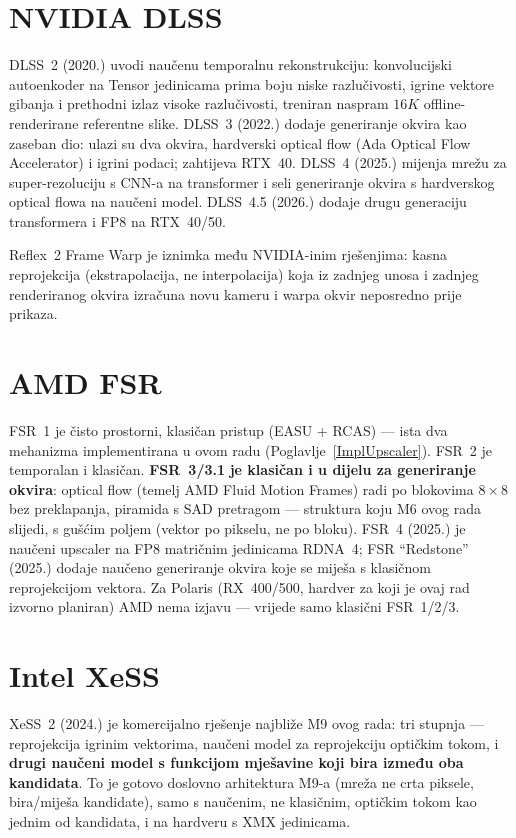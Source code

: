 \documentclass{mathos}
\begin{document}
\section{NVIDIA DLSS}

DLSS~2 (2020.) \cite{DLSSNvidia} uvodi naučenu temporalnu rekonstrukciju: konvolucijski
autoenkoder na Tensor jedinicama prima boju niske razlučivosti, igrine
vektore gibanja i prethodni izlaz visoke razlučivosti, treniran naspram
$16K$ offline-renderirane referentne slike. DLSS~3 (2022.) dodaje generiranje
okvira kao zaseban dio: ulazi su dva okvira, hardverski optical flow (Ada
Optical Flow Accelerator) i igrini podaci; zahtijeva RTX~40. DLSS~4 (2025.)
mijenja mrežu za super-rezoluciju s CNN-a na transformer i seli generiranje
okvira s hardverskog optical flowa na naučeni model. DLSS~4.5 (2026.) dodaje
drugu generaciju transformera i FP8 na RTX~40/50.

Reflex~2 Frame Warp \cite{ReflexNvidia} je iznimka među NVIDIA-inim rješenjima: kasna
reprojekcija (ekstrapolacija, ne interpolacija) koja iz zadnjeg unosa i
zadnjeg renderiranog okvira izračuna novu kameru i warpa okvir neposredno
prije prikaza.

\section{AMD FSR}

FSR~1 je čisto prostorni, klasičan pristup (EASU + RCAS) — ista dva
mehanizma implementirana u ovom radu (Poglavlje~\ref{ImplUpscaler}). FSR~2
je temporalan i klasičan. \textbf{FSR~3/3.1} \cite{FSR3GPUOpen} \textbf{je klasičan i u dijelu za
generiranje okvira}: optical flow (temelj AMD Fluid Motion Frames) radi po
blokovima $8\times8$ bez preklapanja, piramida s SAD pretragom — struktura
koju M6 ovog rada slijedi, s gušćim poljem (vektor po pikselu, ne po bloku).
FSR~4 (2025.) je naučeni upscaler na FP8 matričnim jedinicama RDNA~4; FSR
``Redstone'' (2025.) dodaje naučeno generiranje okvira koje se miješa s
klasičnom reprojekcijom vektora. Za Polaris (RX~400/500, hardver za koji je
ovaj rad izvorno planiran) AMD nema izjavu — vrijede samo klasični FSR~1/2/3.

\section{Intel XeSS}

XeSS~2 (2024.) \cite{XeSSIntel} je komercijalno rješenje najbliže M9 ovog rada: tri stupnja —
reprojekcija igrinim vektorima, naučeni model za reprojekciju optičkim
tokom, i \textbf{drugi naučeni model s funkcijom mješavine koji bira između
oba kandidata}. To je gotovo doslovno arhitektura M9-a (mreža ne crta
piksele, bira/miješa kandidate), samo s naučenim, ne klasičnim, optičkim
tokom kao jednim od kandidata, i na hardveru s XMX jedinicama.
\end{document}
